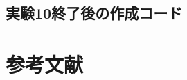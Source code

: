 \documentclass[epsf,a4paper,dvipdfmx,autodetect-engine,titlepage]{jsarticle}
\begin{document}
\subsection{実験10終了後の作成コード}




\section{参考文献}
\begin{thebibliography}{100}
\bibitem{}\url{}
\end{thebibliography}
\end{document}
